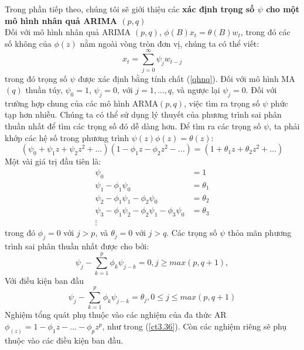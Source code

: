\documentclass[12pt, a4paper,oneside]{book}
\theoremstyle{definition}
\begin{document}
Trong phần tiếp theo, chúng tôi sẽ giới thiệu các \textbf{xác định trọng số $\psi$ cho một mô hình nhân quả ARIMA $(p,q)$}\\

Đối với mô hình nhân quả ARIMA $(p,q)$, $\phi(B)x_{t}=\theta(B)w_{t}$, trong đó các số không của $\phi(z)$ nằm ngoài vòng tròn đơn vị, chúng ta có thể viết:  
$$x_{t}=\sum_{j=0}^{\infty}\psi_{j}w_{t-j}$$
trong đó trọng số $\psi$ được xác định bằng tính chất (\ref{qhnq}).
Đối với mô hình MA$(q)$ thuần túy, $\psi_{0}=1$, $\psi_{j}=0$, với $j=1,...,q$, và ngược lại $\psi_{j}=0$. Đối với trường hợp chung của các mô hình ARMA$(p,q)$, việc tìm ra trọng số $\psi$ phức tạp hơn nhiều. Chúng ta có thể sử dụng lý thuyết của phương trình sai phân thuần nhất để tìm các trọng số đó dễ dàng hơn. Để tìm ra các trọng số $\psi$, ta phải khớp các hệ số trong phương trình $\psi(z)\phi(z)=\theta(z)$:
$$(\psi_{0}+\psi_{1}z+\psi_{2}z^{2}+...)(1-\phi_{1}z-\phi_{2}z^{2}-...)=(1+\theta_{1}z+\theta_{2}z^{2}+...)$$
Một vài giá trị đầu tiên là:
\begin{align*}
\psi_{0}&=1\\
\psi_{1}-\phi_{1}\psi_{0}&=\theta_{1}\\
\psi_{2}-\phi_{1}\psi_{1}-\phi_{2}\psi_{0}&=\theta_{2}\\
\psi_{3}-\phi_{1}\psi_{2}-\phi_{2}\psi_{1}-\phi_{3}\psi_{0}&=\theta_{3}\\
\vdots
\end{align*}
trong đó $\phi_{j}=0$ với $j>p$, và $\theta_{j}=0$ với $j>q$. Các trọng số $\psi$ thỏa mãn phương trình sai phân thuần nhất được cho bởi:
\begin{equation}
\psi_{j}-\sum_{k=1}^{p}\phi_{k}\psi_{j-k}=0, j\geqslant max(p,q+1), \label{ct3.36}
\end{equation}
Với điều kiện ban đầu
\begin{equation}
\psi_{j}-\sum_{k=1}^{p}\phi_{k}\psi_{j-k}=\theta_{j}, 0\leqslant j \leqslant max(p, q+1) \label{ct3.37}
\end{equation}
Nghiệm tổng quát phụ thuộc vào các nghiệm của đa thức AR $\phi_(z)=1-\phi_{1}z-...-\phi_{p}z^{p}$, như trong (\ref{ct3.36}). Còn các nghiệm riêng sẽ phụ thuộc vào các điều kiện ban đầu.
\end{document}
